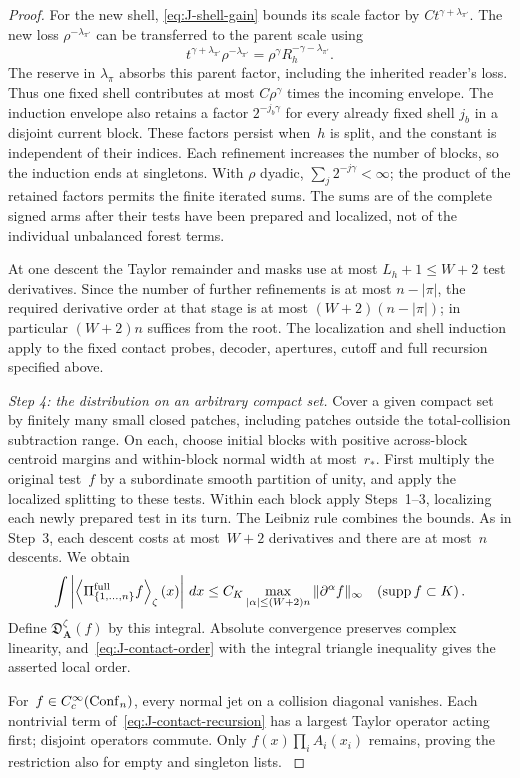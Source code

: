 \begin{proof}
For the new shell, \eqref{eq:J-shell-gain} bounds its scale factor by $Ct^{\gamma+\lambda_{\pi'}}$. The new loss $\rho^{-\lambda_{\pi'}}$ can be transferred to the parent scale using
\[
 t^{\gamma+\lambda_{\pi'}}\rho^{-\lambda_{\pi'}}
 =\rho^\gamma R_h^{-\gamma-\lambda_{\pi'}}.
\]
The reserve in $\lambda_\pi$ absorbs this parent factor, including the inherited reader's loss. Thus one fixed shell contributes at most $C\rho^\gamma$ times the incoming envelope. The induction envelope also retains a factor $2^{-j_b\gamma}$ for every already fixed shell $j_b$ in a disjoint current block. These factors persist when~$h$ is split, and the constant is independent of their indices. Each refinement increases the number of blocks, so the induction ends at singletons. With $\rho$ dyadic, $\sum_j2^{-j\gamma}<\infty$; the product of the retained factors permits the finite iterated sums. The sums are of the complete signed arms after their tests have been prepared and localized, not of the individual unbalanced forest terms.

At one descent the Taylor remainder and masks use at most $L_h+1\le W+2$ test derivatives. Since the number of further refinements is at most $n-|\pi|$, the required derivative order at that stage is at most $(W+2)(n-|\pi|)$; in particular $(W+2)n$ suffices from the root. The localization and shell induction apply to the fixed contact probes, decoder, apertures, cutoff and full recursion specified above.

\emph{Step 4: the distribution on an arbitrary compact set.} Cover a given compact set by finitely many small closed patches, including patches outside the total-collision subtraction range. On each, choose initial blocks with positive across-block centroid margins and within-block normal width at most~$r_*$. First multiply the original test~$f$ by a subordinate smooth partition of unity, and apply the localized splitting to these tests. Within each block apply Steps~1--3, localizing each newly prepared test in its turn. The Leibniz rule combines the bounds. As in Step~3, each descent costs at most~$W+2$ derivatives and there are at most~$n$ descents. We obtain
\begin{equation}\label{eq:J-contact-order}
\int\left|\left\langle\Pi_{\{1,\ldots,n\}}^{\rm full}f
                    \right\rangle_\zeta(x)\right|\,dx
\le C_K\max_{|\alpha|\le(W+2)n}\|\partial^\alpha f\|_\infty
\quad(\operatorname{supp}f\subset K)\,.
\end{equation}
Define $\mathfrak D_{\boldsymbol A}^\zeta(f)$ by this integral. Absolute convergence preserves complex linearity, and~\eqref{eq:J-contact-order} with the integral triangle inequality gives the asserted local order.

For~$f\in C_c^\infty(\mathrm{Conf}_{n})$, every normal jet on a collision diagonal vanishes. Each nontrivial term of~\eqref{eq:J-contact-recursion} has a largest Taylor operator acting first; disjoint operators commute. Only $f(x)\prod_iA_i(x_i)$ remains, proving the restriction also for empty and singleton lists.
\label{proof:J2.2-end}
\end{proof}


